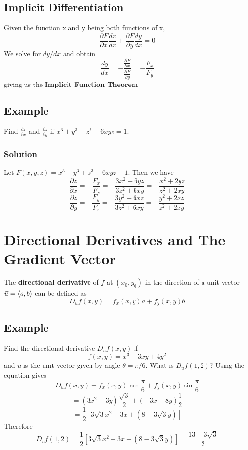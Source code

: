 \subsection*{Implicit Differentiation}
Given the function x and y being both functions of x, $$\frac{\partial F}{\partial x}\frac{dx}{dx} + \frac{\partial F}{\partial y}\frac{dy}{dx} = 0$$
We solve for $dy/dx$ and obtain $$\frac{dy}{dx} = -\frac{\frac{\partial F}{\partial x}}{\frac{\partial F}{\partial y}} = -\frac{F_x}{F_y}$$
giving us the \textbf{Implicit Function Theorem}
\subsection*{Example}
Find $\frac{\partial z}{\partial x}$ and $\frac{\partial z}{\partial y}$ if $x^3 + y^3 + z^3 + 6xyz = 1$.
\subsubsection*{Solution}
Let $F(x,y,z) = x^3 + y^3 + z^3 + 6xyz - 1$. Then we have
$$\frac{\partial z}{\partial x} = -\frac{F_x}{F_z} = -\frac{3x^2 + 6yz}{3z^2 + 6xy} = -\frac{x^2 + 2yz}{z^2 + 2xy}$$
$$\frac{\partial z}{\partial y} = -\frac{F_y}{F_z} = -\frac{3y^2 + 6xz}{3z^2 + 6xy} = -\frac{y^2 + 2xz}{z^2 + 2xy}$$


\section{Directional Derivatives and The Gradient Vector}
The \textbf{directional derivative} of $f$ at $(x_0, y_0)$ in the direction of a unit vector $\vec{u} = \ev{a,b}$ can be defined as 
$$D_uf(x,y) = f_x(x,y)a + f_y(x,y)b$$
\subsection*{Example}
Find the directional derivative $D_uf(x,y)$ if $$f(x,y) = x^3 - 3xy + 4y^2$$ and $u$ is the unit vector given by angle $\theta = \pi/6$. What is $D_uf(1,2)$?
Using the equation gives
$$D_uf(x,y) = f_x(x,y)\cos{\frac{\pi}{6}} + f_y(x,y)\sin{\frac{\pi}{6}}$$
$$= (3x^2 - 3y)\frac{\sqrt{3}}{2} + (-3x + 8y)\frac{1}{2}$$ $$= \frac{1}{2}\left[3\sqrt{3}x^2 - 3x + (8-3\sqrt{3}y)\right]$$
Therefore $$D_uf(1,2) = \frac{1}{2}\left[3\sqrt{3}x^2 - 3x + (8-3\sqrt{3}y)\right] = \frac{13 - 3\sqrt{3}}{2}$$
